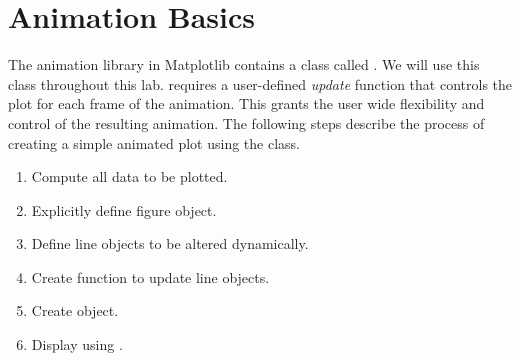 \begin{comment} 
As mentioned in the Introduction to Matplotlib lab in Volume 1, 3D plots and animations are useful in visualizing solutions to ODEs and PDEs found in many dynamics and control problems.
This lab covers basics for 3D plotting, animating 2D plots, and animating 3D trajectories and 3D surfaces. 

In Matplotlib, plots are created using figure objects.
It is possible to create a plot without explicitily instantiating the figure object, but creating an instance separately allows for useful functions to be called on that object. Initializing a figure object is done using the following code:

\begin{lstlisting}
>>> fig = plt.figure()
\end{lstlisting}

3D plotting and animation both require the figure object to be created explicitly. 
\end{comment}
\begin{comment}
\begin{info}
There are different options for plotting in Jupyter Notebook.
In the past we have used \li{\%matplotlib inline}.
For labs with animation we will use \li{\%matplotlib notebook} instead.
This is an interactive regime that allows animations to be displayed without creating a new window.
\end{info}
\end{comment}

\section*{Animation Basics}
The animation library in Matplotlib contains a class called .
We will use this class throughout this lab.  requires a user-defined \textit{update} function that controls the plot for each frame of the animation. 
This grants the user wide flexibility and control of the resulting animation.
The following steps describe the process of creating a simple animated plot using the  class. 
\begin{enumerate}
\item Compute all data to be plotted.
\item Explicitly define figure object.
\item Define line objects to be altered dynamically.
\item Create function to update line objects.
\item Create  object.
\item Display using .
\end{enumerate}

